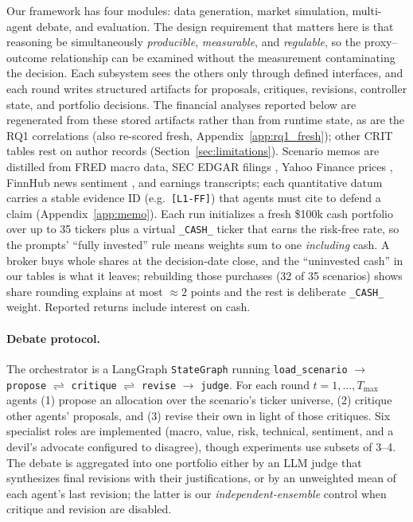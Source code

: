 \documentclass{article}
\begin{document}
Our framework has four modules: data generation, market simulation, multi-agent debate,
and evaluation. The design requirement that matters here is that reasoning be
simultaneously \emph{producible}, \emph{measurable}, and \emph{regulable}, so the
proxy--outcome relationship can be examined without the measurement contaminating the
decision. Each subsystem sees the others only through defined interfaces, and each round writes structured artifacts for proposals, critiques, revisions, controller state, and portfolio decisions. The financial analyses reported below are regenerated from these stored artifacts rather than from runtime state, as are the RQ1 correlations (also re-scored fresh, Appendix~\ref{app:rq1_fresh}); other CRIT tables rest on author records (Section~\ref{sec:limitations}).
Scenario memos are distilled from FRED macro data, SEC EDGAR filings
\citep{SEC_EDGAR_API}, Yahoo Finance prices \citep{yahoofinance}, FinnHub news sentiment
\citep{finnhub_api}, and earnings transcripts; each quantitative datum carries a stable
evidence ID (e.g.\ \texttt{[L1-FF]}) that agents must cite to defend a claim
(Appendix~\ref{app:memo}). Each run initializes a fresh \$100k cash portfolio over up to
35 tickers plus a virtual \texttt{\_CASH\_} ticker that earns the risk-free rate, so the
prompts' ``fully invested'' rule means weights sum to one \emph{including} cash. A broker
buys whole shares at the decision-date close, and the ``uninvested cash'' in our tables is
what it leaves; rebuilding those purchases (32 of 35 scenarios) shows share rounding
explains at most ${\approx}2$ points and the rest is deliberate \texttt{\_CASH\_} weight.
Reported returns include interest on cash.

\vspace{-4pt}
\paragraph{Debate protocol.}
The orchestrator is a LangGraph \texttt{StateGraph} \citep{langgraph} running
\texttt{load\_scenario} $\to$ \texttt{propose} $\rightleftharpoons$ \texttt{critique}
$\rightleftharpoons$ \texttt{revise} $\to$ \texttt{judge}. For each round
$t=1,\dots,T_{\max}$ agents (1) propose an allocation over the scenario's ticker
universe, (2) critique other agents' proposals, and (3) revise their own in light of
those critiques. Six specialist roles are implemented (macro, value, risk, technical, sentiment, and a devil's advocate configured to disagree), though experiments use
subsets of 3--4. The debate is aggregated into one portfolio either by an LLM judge that
synthesizes final revisions with their justifications, or by an unweighted mean of each
agent's last revision; the latter is our \emph{independent-ensemble} control when
critique and revision are disabled.
\end{document}
